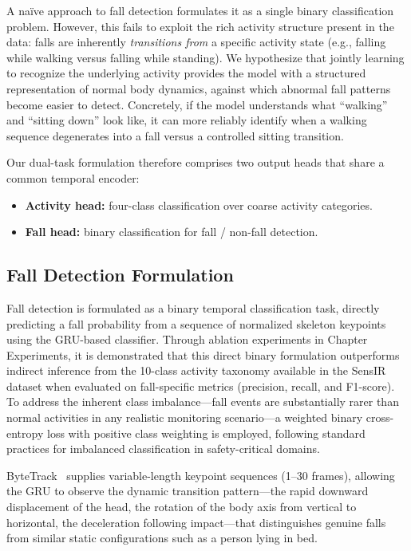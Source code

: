 A na\"ive approach to fall detection formulates it as a single binary classification problem. However, this fails to exploit the rich activity structure present in the data: falls are inherently \emph{transitions from} a specific activity state (e.g., falling while walking versus falling while standing). We hypothesize that jointly learning to recognize the underlying activity provides the model with a structured representation of normal body dynamics, against which abnormal fall patterns become easier to detect. Concretely, if the model understands what ``walking'' and ``sitting down'' look like, it can more reliably identify when a walking sequence degenerates into a fall versus a controlled sitting transition.

Our dual-task formulation therefore comprises two output heads that share a common temporal encoder:
\begin{itemize}
    \item \textbf{Activity head:} four-class classification over coarse activity categories.
    \item \textbf{Fall head:} binary classification for fall / non-fall detection.
\end{itemize}

\subsection{Fall Detection Formulation}
\label{subsec:fall_formulation}

Fall detection is formulated as a binary temporal classification task, directly predicting a fall probability from a sequence of normalized skeleton keypoints using the GRU-based classifier. Through ablation experiments in Chapter Experiments, it is demonstrated that this direct binary formulation outperforms indirect inference from the 10-class activity taxonomy available in the SensIR dataset when evaluated on fall-specific metrics (precision, recall, and F1-score). To address the inherent class imbalance---fall events are substantially rarer than normal activities in any realistic monitoring scenario---a weighted binary cross-entropy loss with positive class weighting is employed, following standard practices for imbalanced classification in safety-critical domains.

ByteTrack~\cite{zhang2022bytetrack} supplies variable-length keypoint sequences (1--30 frames), allowing the GRU to observe the dynamic transition pattern---the rapid downward displacement of the head, the rotation of the body axis from vertical to horizontal, the deceleration following impact---that distinguishes genuine falls from similar static configurations such as a person lying in bed.

